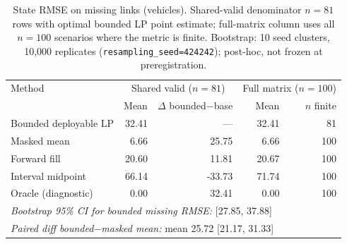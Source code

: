 \begin{table}[t]
\centering
\caption{State RMSE on missing links (vehicles). Shared-valid denominator $n{=}81$ rows with optimal bounded LP point estimate; full-matrix column uses all $n{=}100$ scenarios where the metric is finite. Bootstrap: 10 seed clusters, 10{,}000 replicates (\texttt{resampling\_seed=424242}); post-hoc, not frozen at preregistration.}
\label{tab:primary-rmse}
\small
\begin{tabular}{lrrrr}
\toprule
Method & \multicolumn{2}{c}{Shared valid ($n{=}81$)} & \multicolumn{2}{c}{Full matrix ($n{=}100$)} \\
 & Mean & $\Delta$ bounded$-$base & Mean & $n$ finite \\
\midrule
Bounded deployable LP & 32.41 & --- & 32.41 & 81 \\
Masked mean & 6.66 & 25.75 & 6.66 & 100 \\
Forward fill & 20.60 & 11.81 & 20.67 & 100 \\
Interval midpoint & 66.14 & -33.73 & 71.74 & 100 \\
Oracle (diagnostic) & 0.00 & 32.41 & 0.00 & 100 \\
\midrule
\multicolumn{5}{l}{\textit{Bootstrap 95\% CI for bounded missing RMSE:} [27.85, 37.88]} \\
\multicolumn{5}{l}{\textit{Paired diff bounded$-$masked mean:} mean 25.72 [21.17, 31.33]} \\
\bottomrule
\end{tabular}
\end{table}
